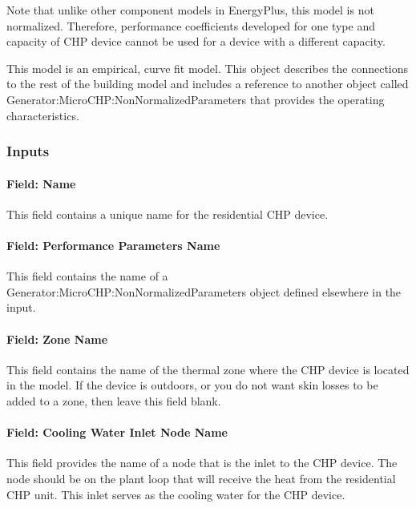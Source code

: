 Note that unlike other component models in EnergyPlus, this model is not normalized. Therefore, performance coefficients developed for one type and capacity of CHP device cannot be used for a device with a different capacity.

This model is an empirical, curve fit model. This object describes the connections to the rest of the building model and includes a reference to another object called Generator:MicroCHP:NonNormalizedParameters that provides the operating characteristics.

\subsubsection{Inputs}\label{inputs-10-003}

\paragraph{Field: Name}\label{field-name-11-003}

This field contains a unique name for the residential CHP device.

\paragraph{Field: Performance Parameters Name}\label{field-performance-parameters-name}

This field contains the name of a Generator:MicroCHP:NonNormalizedParameters object defined elsewhere in the input.

\paragraph{Field: Zone Name}\label{field-zone-name-7-000}

This field contains the name of the thermal zone where the CHP device is located in the model. If the device is outdoors, or you do not want skin losses to be added to a zone, then leave this field blank.

\paragraph{Field: Cooling Water Inlet Node Name}\label{field-cooling-water-inlet-node-name}

This field provides the name of a node that is the inlet to the CHP device. The node should be on the plant loop that will receive the heat from the residential CHP unit. This inlet serves as the cooling water for the CHP device.

